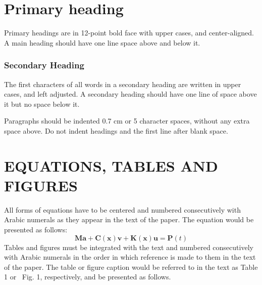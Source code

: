 \documentclass[12pt]{ksiamproc}
\begin{document}
	
	\section*{Primary heading}\noindent%
	Primary headings are in 12-point bold face with upper cases, and
	center-aligned.  A main heading should have one line space above
	and below it.
	\subsubsection*{Secondary Heading} The first characters of all
	words in a secondary heading are written in upper cases, and left
	adjusted. A secondary heading should have one line of space above
	it but no space below it.
	
	Paragraphs should be indented 0.7 cm or 5 character spaces,
	without any extra space above.  Do not indent headings and the
	first line after blank space.
	\section*{EQUATIONS, TABLES AND FIGURES}\noindent%
	All forms of equations have to be centered and numbered
	consecutively with Arabic numerals as they appear in the text of
	the paper. The equation would be presented as follows:
	\begin{equation}\label{eq:1}
		\mathbf{Ma}+\mathbf{C(x)v}+\mathbf{K(x)u}=\mathbf{P}(t)
	\end{equation}
	Tables and figures must be integrated with the text and numbered
	consecutively with Arabic numerals in the order in which reference
	is made to them in the text of the paper.  The table or figure
	caption would be referred to in the text as Table 1 or~ Fig. 1,
	respectively, and be presented as follows.
	
\end{document}
